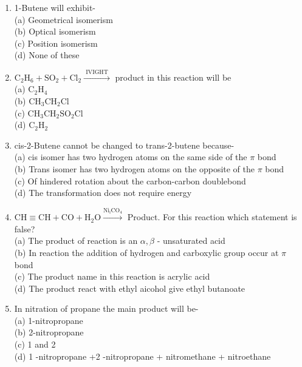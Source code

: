 \documentclass[10pt]{article}
\begin{document}
\begin{enumerate}
(a) Butane\\
(b) Ethane\\
(c) Propane\\
(d) All of the above
  \item 1-Butene will exhibit-\\
(a) Geometrical isomerism\\
(b) Optical isomerism\\
(c) Position isomerism\\
(d) None of these
  \item $\mathrm{C}_{2} \mathrm{H}_{6}+\mathrm{SO}_{2}+\mathrm{Cl}_{2} \xrightarrow{\text { IVIGHT }}$ product in this reaction will be\\
(a) $\mathrm{C}_{2} \mathrm{H}_{4}$\\
(b) $\mathrm{CH}_{3} \mathrm{CH}_{2} \mathrm{Cl}$\\
(c) $\mathrm{CH}_{3} \mathrm{CH}_{2} \mathrm{SO}_{2} \mathrm{Cl}$\\
(d) $\mathrm{C}_{2} \mathrm{H}_{2}$
  \item cis-2-Butene cannot be changed to trans-2-butene because-\\
(a) cis isomer has two hydrogen atoms on the same side of the $\pi$ bond\\
(b) Trans isomer has two hydrogen atoms on the opposite of the $\pi$ bond\\
(c) Of hindered rotation about the carbon-carbon doublebond\\
(d) The transformation does not require energy
  \item $\mathrm{CH} \equiv \mathrm{CH}+\mathrm{CO}+\mathrm{H}_{2} \mathrm{O} \xrightarrow{\mathrm{Ni}_{\mathrm{i}} \mathrm{CO}_{4}}$ Product. For this reaction which statement is false?\\
(a) The product of reaction is an $\alpha, \beta$ - unsaturated acid\\
(b) In reaction the addition of hydrogen and carboxylic group occur at $\pi$ bond\\
(c) The product name in this reaction is acrylic acid\\
(d) The product react with ethyl aicohol give ethyl butanoate
  \item In nitration of propane the main product will be-\\
(a) 1-nitropropane\\
(b) 2-nitropropane\\
(c) 1 and 2\\
(d) 1 -nitropropane +2 -nitropropane + nitromethane + nitroethane

\end{enumerate}
\end{document}
